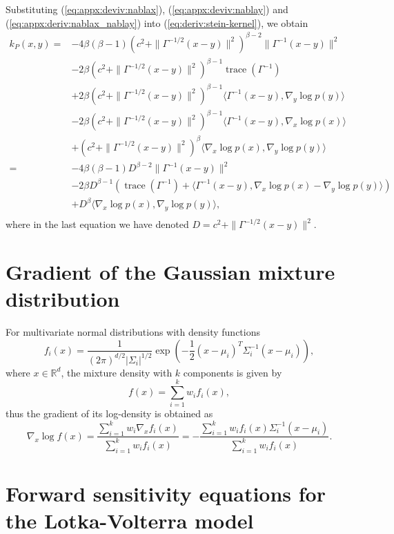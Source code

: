 \documentclass[11pt,a4paper]{report}
\DeclareMathOperator{\trace}{trace}
\begin{document}
Substituting (\ref{eq:appx:deviv:nablax}), (\ref{eq:appx:deviv:nablay}) and (\ref{eq:appx:deriv:nablax_nablay}) into (\ref{eq:deriv:stein-kernel}), we obtain
\begin{equation}
\begin{aligned}
k_P(x, y)
= &-4 \beta(\beta-1) \left(c^2 + \| \Gamma^{-1/2}(x-y)\|^2\right)^{\beta-2} \| \Gamma^{-1}(x - y)\|^2 \\
&- 2\beta \left(c^2 + \|\Gamma^{-1/2}(x-y)\|^2\right)^{\beta-1} \trace(\Gamma^{-1}) \\
&+ 2 \beta \left(c^2 + \| \Gamma^{-1/2} (x-y)\|^2\right)^{\beta-1} \langle \Gamma^{-1} (x - y), \nabla_y \log p(y)\rangle \\
&- 2 \beta \left(c^2 + \| \Gamma^{-1/2} (x-y)\|^2\right)^{\beta-1} \langle \Gamma^{-1} (x - y), \nabla_x \log p(x)\rangle \\
&+ \left(c^2 + \| \Gamma^{-1/2} (x-y)\|^2\right)^\beta \langle \nabla_x \log p(x), \nabla_y \log p(y) \rangle \\
= &-4 \beta(\beta-1) D^{\beta-2} \| \Gamma^{-1}(x - y)\|^2  \\
&- 2 \beta D^{\beta-1} (\trace(\Gamma^{-1}) + \langle \Gamma^{-1} (x - y), \nabla_x \log p(x) - \nabla_y \log p(y)\rangle) \\
&+ D^\beta \langle \nabla_x \log p(x), \nabla_y \log p(y) \rangle, \\
\end{aligned}
\label{eq:k_P:IMQ}
\end{equation}
where in the last equation we have denoted $D = c^2 + \| \Gamma^{-1/2}(x-y)\|^2$.

\section{Gradient of the Gaussian mixture distribution}
\label{appendix:derivations:gaussian-mixture-gradient}

For multivariate normal distributions with density functions
$$f_i(x) = \frac{1}{(2\pi)^{d/2} |\Sigma_i|^{1/2}}\exp\left(-\frac{1}{2}(x - \mu_i)^T \Sigma_i^{-1}(x - \mu_i)\right),$$
where $x \in \mathbb{R}^d$, the mixture density with $k$ components is given by
$$f(x) = \sum_{i=1}^k w_i f_i(x),$$
thus the gradient of its log-density is obtained as
$$\nabla_{x} \log f(x) = \frac{\sum_{i=1}^k w_i \nabla_{x} f_i(x)}{\sum_{i=1}^k w_i f_i(x)} = -\frac{\sum_{i=1}^k w_i f_i(x) \Sigma_i^{-1}(x - \mu_i)}{\sum_{i=1}^k w_i f_i(x)}.$$

\section{Forward sensitivity equations for the Lotka-Volterra model}
\label{appendix:derivations:forward-sensitivity}
\end{document}
